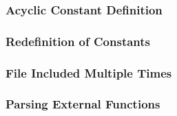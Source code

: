 \subsubsection{Acyclic Constant Definition}\label{sec:warn:cycdef}

\subsubsection{Redefinition of Constants}\label{sec:warn:redef}

\subsubsection{File Included Multiple Times}\label{sec:warn:incfile}

\subsubsection{Parsing External Functions}\label{sec:warn:parseext}


